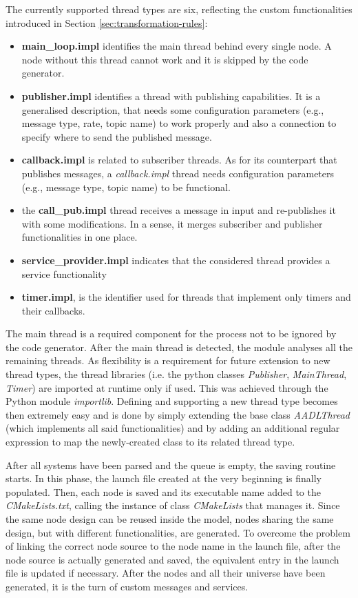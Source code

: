 The currently supported thread types are six, reflecting the custom functionalities introduced in Section \ref{sec:transformation-rules}:
\begin{itemize}
\item{ \textbf{main\_loop.impl} identifies the main thread behind every single node. A node without this thread cannot work and it is skipped by the code generator.}
\item {\textbf{publisher.impl} identifies a thread with publishing capabilities. It is a generalised description, that needs some configuration parameters (e.g., message type, rate, topic name) to work properly and also a connection to specify where to send the published message.}
\item \textbf{callback.impl} is related to subscriber threads. As for its counterpart that publishes messages, a \textit{callback.impl} thread needs configuration parameters (e.g., message type, topic name) to be functional.
\item the \textbf{call\_pub.impl} thread receives a message in input and re-publishes it with some modifications. In a sense, it merges subscriber and publisher functionalities in one place.
\item \textbf{service\_provider.impl} indicates that the considered thread provides a service functionality
\item \textbf{timer.impl}, is the identifier used for threads that implement only timers and their callbacks.
\end{itemize}

The main thread is a required component for the process not to be ignored by the code generator. After the main thread is detected, the module analyses all the remaining threads. As flexibility is a requirement for future extension to new thread types, the thread libraries (i.e. the python classes \textit{Publisher}, \textit{MainThread}, \textit{Timer}) are imported at runtime only if used. This was achieved through the Python module \textit{importlib}. Defining and supporting a new thread type becomes then extremely easy and is done by simply extending the base class \textit{AADLThread} (which implements all said functionalities) and by adding an additional regular expression to map the newly-created class to its related thread type.

After all systems have been parsed and the queue is empty, the saving routine starts. In this phase, the launch file created at the very beginning is finally populated. Then, each node is saved and its executable name added to the \textit{CMakeLists.txt}, calling the instance of class \textit{CMakeLists} that manages it. Since the same node design can be reused inside the model, nodes sharing the same design, but with different functionalities, are generated. To overcome the problem of linking the correct node source to the node name in the launch file, after the node source is actually generated and saved, the equivalent entry in the launch file is updated if necessary. After the nodes and all their universe have been generated, it is the turn of custom messages and services.

